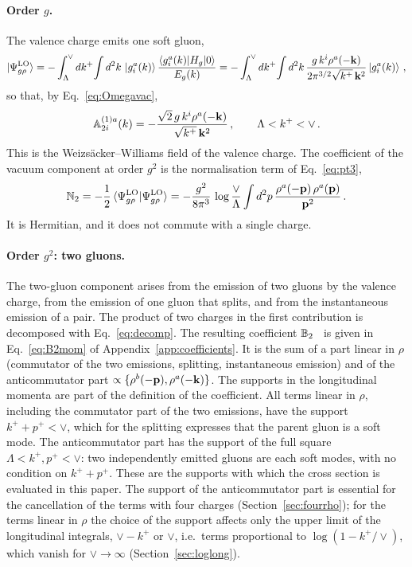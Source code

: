 \paragraph{Order $g$.} The valence charge emits one soft gluon,
\begin{align}\label{eq:PsiLO}
\ket{\Psi^{\rm LO}_{g\rho}}=-\int_\Lambda^\vee dk^+\!\int d^2k\,\ket{g^a_i(k)}\frac{\braket{g^a_i(k)|H_g|0}}{E_g(k)}
=-\int_\Lambda^\vee dk^+\!\int d^2k\,\frac{g\,k^i\rho^a(-\mathbf{k})}{2\pi^{3/2}\sqrt{k^+}\,\mathbf{k}^2}\ket{g^a_i(k)}\,,
\end{align}
so that, by Eq.~\eqref{eq:Omegavac},
\begin{align}\label{eq:A1mom}
\mathbb{A}^{(1)a}_{2i}(k)=-\frac{\sqrt2\,g\,k^i\rho^a(-\mathbf{k})}{\sqrt{k^+}\,\mathbf{k}^2}\,,\qquad \Lambda<k^+<\vee\,.
\end{align}
This is the Weizs\"acker--Williams field of the valence charge. The coefficient of the vacuum component at order $g^2$ is the normalisation term of Eq.~\eqref{eq:pt3},
\begin{align}\label{eq:N2mom}
\mathbb{N}_2=-\frac12\braket{\Psi^{\rm LO}_{g\rho}|\Psi^{\rm LO}_{g\rho}}=-\frac{g^2}{8\pi^3}\,\log\frac{\vee}{\Lambda}\int d^2p\,\frac{\rho^a(-\mathbf{p})\,\rho^a(\mathbf{p})}{\mathbf{p}^2}\,.
\end{align}
It is Hermitian, and it does not commute with a single charge.

\paragraph{Order $g^2$: two gluons.} The two-gluon component arises from the emission of two gluons by the valence charge, from the emission of one gluon that splits, and from the instantaneous emission of a pair. The product of two charges in the first contribution is decomposed with Eq.~\eqref{eq:decomp}. The resulting coefficient $\mathbb{B}_2$~\cite{Lublinsky:2016meo} is given in Eq.~\eqref{eq:B2mom} of Appendix~\ref{app:coefficients}. It is the sum of a part linear in $\rho$ (commutator of the two emissions, splitting, instantaneous emission) and of the anticommutator part $\propto\{\rho^b(-\mathbf{p}),\rho^a(-\mathbf{k})\}$. The supports in the longitudinal momenta are part of the definition of the coefficient. All terms linear in $\rho$, including the commutator part of the two emissions, have the support $k^++p^+<\vee$, which for the splitting expresses that the parent gluon is a soft mode. The anticommutator part has the support of the full square $\Lambda<k^+,p^+<\vee$: two independently emitted gluons are each soft modes, with no condition on $k^++p^+$. These are the supports with which the cross section is evaluated in this paper. The support of the anticommutator part is essential for the cancellation of the terms with four charges (Section~\ref{sec:fourrho}); for the terms linear in $\rho$ the choice of the support affects only the upper limit of the longitudinal integrals, $\vee-k^+$ or $\vee$, i.e.\ terms proportional to $\log(1-k^+/\vee)$, which vanish for $\vee\to\infty$ (Section~\ref{sec:loglong}).

